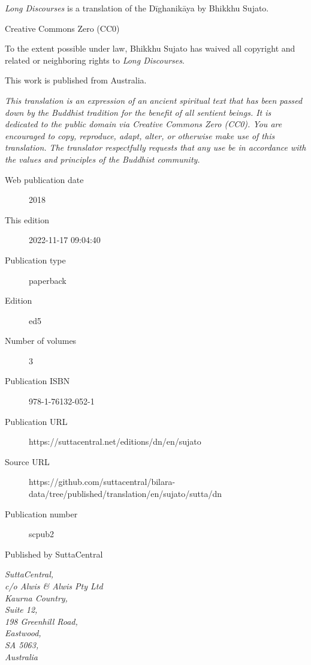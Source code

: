 \documentclass[12pt,openany]{book}%
\begin{document}
\begin{footnotesize}

\textit{Long Discourses} is a translation of the Dīghanikāya by Bhikkhu Sujato.

\medskip

Creative Commons Zero (CC0)

To the extent possible under law, Bhikkhu Sujato has waived all copyright and related or neighboring rights to \textit{Long Discourses}.

\medskip

This work is published from Australia.

\begin{center}
\textit{This translation is an expression of an ancient spiritual text that has been passed down by the Buddhist tradition for the benefit of all sentient beings. It is dedicated to the public domain via Creative Commons Zero (CC0). You are encouraged to copy, reproduce, adapt, alter, or otherwise make use of this translation. The translator respectfully requests that any use be in accordance with the values and principles of the Buddhist community.}
\end{center}

\medskip

\begin{description}
    \item[Web publication date] 2018
    \item[This edition] 2022-11-17 09:04:40
    \item[Publication type] paperback
    \item[Edition] ed5
    \item[Number of volumes] 3
    \item[Publication ISBN] 978-1-76132-052-1
    \item[Publication URL] https://suttacentral.net/editions/dn/en/sujato
    \item[Source URL] https://github.com/suttacentral/bilara-data/tree/published/translation/en/sujato/sutta/dn
    \item[Publication number] scpub2
\end{description}

\medskip

Published by SuttaCentral

\medskip

\textit{SuttaCentral,\\
c/o Alwis \& Alwis Pty Ltd\\
Kaurna Country,\\
Suite 12,\\
198 Greenhill Road,\\
Eastwood,\\
SA 5063,\\
Australia}

\end{footnotesize}
\end{document}
